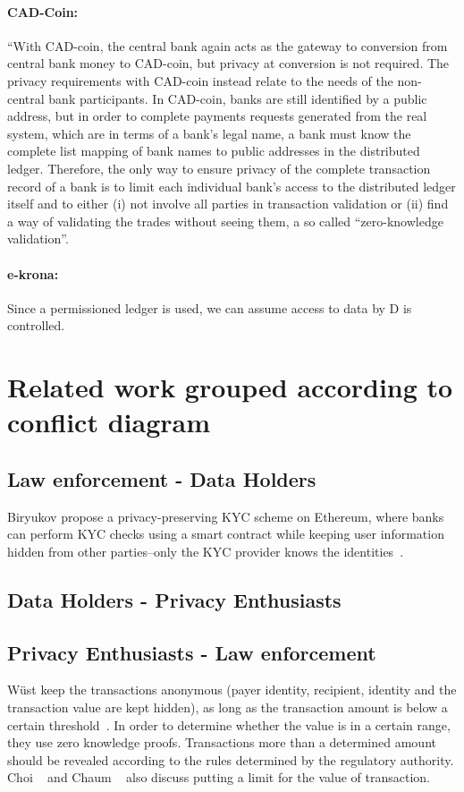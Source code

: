 \documentclass[runningheads]{llncs}
\begin{document}
 \paragraph{CAD-Coin:} 
 
 ``With CAD-coin, the central bank again acts as the gateway to conversion from central bank money to CAD-coin, but privacy at conversion is not required.  The privacy requirements with CAD-coin instead relate to the needs of the non-central bank participants.  In CAD-coin, banks are still identified by a public address, but in order to complete payments requests generated from the real system, which are in terms of a bank’s legal name, a bank must know the complete list mapping of bank names to public addresses in the distributed ledger. Therefore, the only way to ensure privacy of the complete transaction record of a bank is to limit each individual bank’s access to the distributed ledger itself and to either (i) not involve all parties in transaction validation or (ii) find a way of validating the trades without seeing them, a so called “zero-knowledge validation”.~\cite{GR16}
 
 \paragraph{e-krona:} Since a permissioned ledger is used, we can assume access to data by D is controlled.
 
\section{Related work grouped according to conflict diagram}
\subsection{Law enforcement - Data Holders}
 Biryukov \etal propose a privacy-preserving KYC scheme on Ethereum, where banks can perform KYC checks using a smart contract while keeping user information hidden from other parties--only the KYC provider knows the identities~\cite{BKT18}.

\subsection{Data Holders - Privacy Enthusiasts}

\subsection{Privacy Enthusiasts - Law enforcement}
W{\"u}st \etal keep the transactions anonymous (payer identity, recipient, identity and the transaction value are kept hidden), as long as the transaction amount is below a certain threshold~\cite{WKCC18}. In order to determine whether the value is in a certain range, they use zero knowledge proofs. Transactions more than a determined amount should be revealed according to the rules determined by the regulatory authority. Choi \etal ~\cite{CHLRS21} and Chaum \etal ~\cite{CGM21} also discuss putting a limit for the value of transaction.
\end{document}
